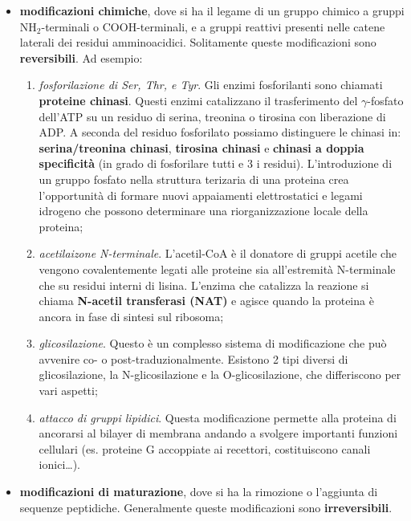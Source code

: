 \documentclass[]{article}
\begin{document}
\begin{itemize}
\itemsep1pt\parskip0pt
\item
  \textbf{modificazioni chimiche}, dove si ha il legame di un gruppo
  chimico a gruppi NH\(_2\)-terminali o COOH-terminali, e a gruppi
  reattivi presenti nelle catene laterali dei residui amminoacidici.
  Solitamente queste modificazioni sono \textbf{reversibili}. Ad
  esempio:

  \begin{enumerate}
  \def\labelenumi{\arabic{enumi}.}
  \itemsep1pt\parskip0pt
  \item
    \emph{fosforilazione di Ser, Thr, e Tyr}. Gli enzimi fosforilanti
    sono chiamati \textbf{proteine chinasi}. Questi enzimi catalizzano
    il trasferimento del \(\gamma\)-fosfato dell'ATP su un residuo di
    serina, treonina o tirosina con liberazione di ADP. A seconda del
    residuo fosforilato possiamo distinguere le chinasi in:
    \textbf{serina/treonina chinasi}, \textbf{tirosina chinasi} e
    \textbf{chinasi a doppia specificità} (in grado di fosforilare tutti
    e 3 i residui). L'introduzione di un gruppo fosfato nella struttura
    terizaria di una proteina crea l'opportunità di formare nuovi
    appaiamenti elettrostatici e legami idrogeno che possono determinare
    una riorganizzazione locale della proteina;
  \item
    \emph{acetilaizone N-terminale}. L'acetil-CoA è il donatore di
    gruppi acetile che vengono covalentemente legati alle proteine sia
    all'estremità N-terminale che su residui interni di lisina. L'enzima
    che catalizza la reazione si chiama \textbf{N-acetil transferasi
    (NAT)} e agisce quando la proteina è ancora in fase di sintesi sul
    ribosoma;
  \item
    \emph{glicosilazione}. Questo è un complesso sistema di
    modificazione che può avvenire co- o post-traduzionalmente. Esistono
    2 tipi diversi di glicosilazione, la N-glicosilazione e la
    O-glicosilazione, che differiscono per vari aspetti;
  \item
    \emph{attacco di gruppi lipidici}. Questa modificazione permette
    alla proteina di ancorarsi al bilayer di membrana andando a svolgere
    importanti funzioni cellulari (es. proteine G accoppiate ai
    recettori, costituiscono canali ionici\ldots{}).
  \end{enumerate}
\item
  \textbf{modificazioni di maturazione}, dove si ha la rimozione o
  l'aggiunta di sequenze peptidiche. Generalmente queste modificazioni
  sono \textbf{irreversibili}.


\end{itemize}
\end{document}
